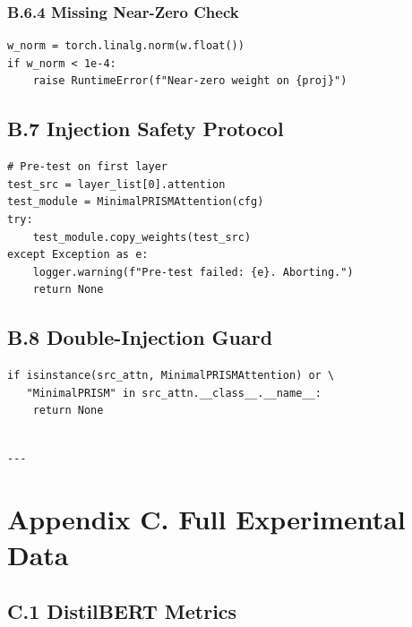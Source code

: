 \subsubsection{B.6.4 Missing Near-Zero Check}

\begin{lstlisting}
w_norm = torch.linalg.norm(w.float())
if w_norm < 1e-4:
    raise RuntimeError(f"Near-zero weight on {proj}")
\end{lstlisting}

\subsection{B.7 Injection Safety Protocol}

\begin{lstlisting}
# Pre-test on first layer
test_src = layer_list[0].attention
test_module = MinimalPRISMAttention(cfg)
try:
    test_module.copy_weights(test_src)
except Exception as e:
    logger.warning(f"Pre-test failed: {e}. Aborting.")
    return None
\end{lstlisting}

\subsection{B.8 Double-Injection Guard}

\begin{lstlisting}
if isinstance(src_attn, MinimalPRISMAttention) or \
   "MinimalPRISM" in src_attn.__class__.__name__:
    return None
\end{lstlisting}
\begin{lstlisting}

---
\end{lstlisting}


\section{Appendix C. Full Experimental Data}

\subsection{C.1 DistilBERT Metrics}

